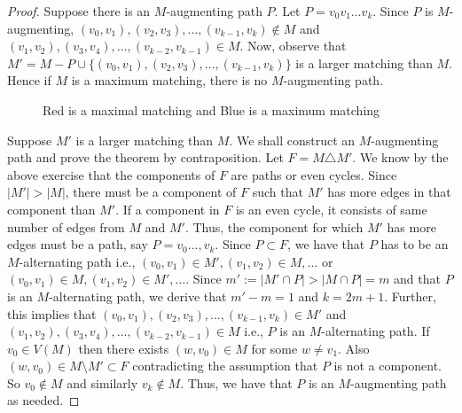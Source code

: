 \documentclass[../basic_graph_theory.tex]{subfiles}
\begin{document}
\begin{proof}
    Suppose there is an $M$-augmenting path $P$. Let $P = v_0v_1\ldots v_k$. Since $P$ is $M$-augmenting, $(v_0,v_1),(v_2,v_3),\ldots,(v_{k-1},v_k) \notin M$ and $(v_1,v_2), (v_3,v_4),\ldots,(v_{k-2},v_{k-1}) \in M$.  Now, observe that $M' = M - P \cup \{ (v_0,v_1),(v_2,v_3),\ldots,(v_{k-1},v_k) \}$ is a larger matching than $M$. Hence if $M$ is a maximum matching, there is no $M$-augmenting path.
    \begin{figure}[htbp]
        \centering
        \caption{Red is a maximal matching and Blue is a maximum matching}
        \label{fig:matching paths}
    \end{figure}
    Suppose $M'$ is a larger matching than $M$. We shall construct an $M$-augmenting path and prove the theorem by contraposition. Let $F = M \triangle M'$. We know by the above exercise that the components of $F$ are paths or even cycles. Since $|M'| > |M|$, there must be a component of $F$ such that $M'$ has more edges in that component than $M'$. If a component in $F$ is an even cycle, it consists of same number of edges from $M$ and $M'$. Thus, the component for which $M'$ has more edges must be a path, say $P = v_0\ldots,v_k$. Since $P \subset F$, we have that $P$ has to be an $M$-alternating path i.e., $(v_0,v_1) \in M', (v_1,v_2) \in M, \ldots$ or $(v_0,v_1) \in M, (v_1,v_2) \in M', \ldots$. Since $m' := |M' \cap P| > |M \cap P| = m$ and that $P$ is an $M$-alternating path,  we derive that $m' - m = 1$ and $k = 2m + 1$.  Further, this implies that $(v_0,v_1),(v_2,v_3),\ldots,(v_{k-1},v_k) \in M'$ and $(v_1,v_2), (v_3,v_4),\ldots,(v_{k-2},v_{k-1}) \in M$ i.e.,  $P$ is an $M$-alternating path.   If $v_0 \in V(M)$ then there exists $(w,v_0) \in M$ for some $w \neq v_1$.  Also $(w,v_0) \in M \setminus M' \subset F$ contradicting the assumption that $P$ is not a component.   So $v_0 \notin M$ and similarly $v_k \notin M$.   Thus,  we have that $P$ is an $M$-augmenting path as needed.
\end{proof}
\end{document}
